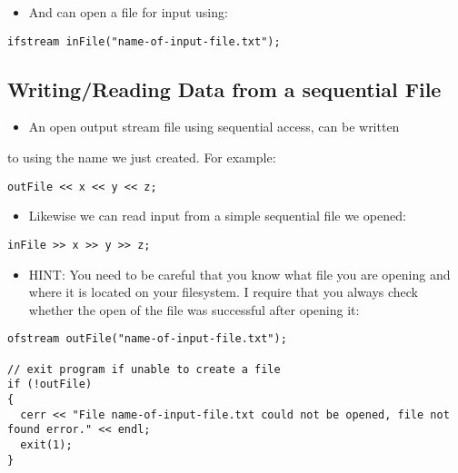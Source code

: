 \documentclass[11pt]{article}
\begin{document}
\begin{itemize}
\item And can open a file for input using:
\end{itemize}

\begin{verbatim}
ifstream inFile("name-of-input-file.txt");
\end{verbatim}
\subsection{Writing/Reading Data from a sequential File}
\label{sec-2-3}

\begin{itemize}
\item An open output stream file using sequential access, can be written
\end{itemize}
to using the name we just created.  For example:

\begin{verbatim}
outFile << x << y << z;
\end{verbatim}

\begin{itemize}
\item Likewise we can read input from a simple sequential file we opened:
\end{itemize}

\begin{verbatim}
inFile >> x >> y >> z;
\end{verbatim}

\begin{itemize}
\item HINT: You need to be careful that you know what file you are opening
and where it is located on your filesystem.  I require that you
always check whether the open of the file was successful after
opening it:
\end{itemize}

\begin{verbatim}
ofstream outFile("name-of-input-file.txt");

// exit program if unable to create a file
if (!outFile)
{
  cerr << "File name-of-input-file.txt could not be opened, file not found error." << endl;
  exit(1);
}
\end{verbatim}
\end{document}
